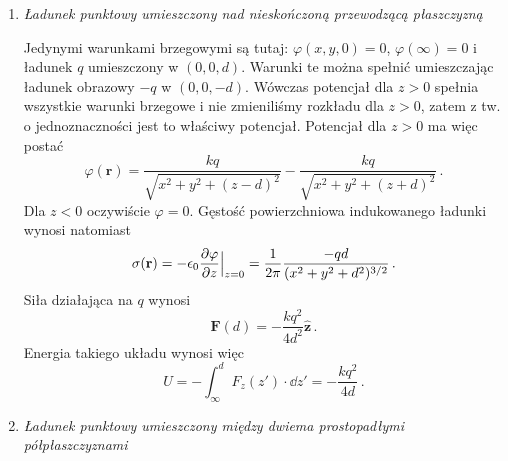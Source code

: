 \documentclass[../main.tex]{subfiles}
\begin{document}
\begin{enumerate}
    \item \textit{Ładunek punktowy umieszczony nad nieskończoną przewodzącą płaszczyzną}
    \medskip
    
    Jedynymi warunkami brzegowymi są tutaj: \(\varphi(x,y,0)=0\), \(\varphi(\infty)=0\) i ładunek
    \(q\) umieszczony w \((0,0,d)\). Warunki te można spełnić umieszczając ładunek obrazowy \(-q\) w
    \((0,0,-d)\). Wówczas potencjał dla \(z>0\) spełnia wszystkie warunki brzegowe i nie zmieniliśmy
    rozkładu dla \(z>0\), zatem z tw. o jednoznaczności jest to właściwy potencjał. Potencjał dla
    \(z>0\) ma więc postać
    \begin{equation*}
        \varphi(\mathbf{r})=\frac{kq}{\sqrt{x^2+y^2+(z-d)^2}}-\frac{kq}{\sqrt{x^2+y^2+(z+d)^2}}\,.
    \end{equation*}
    Dla \(z<0\) oczywiście \(\varphi=0\). Gęstość powierzchniowa indukowanego ładunki wynosi
    natomiast
    \begin{equation*}
        \sigma(\mathbf{r})=-\epsilon_0\pdv{\varphi}{z}\Big|_{z=0}=\frac{1}{2\pi}\frac{-qd}{(x^2+y^2+d^2)^{3/2}}\,.
    \end{equation*}
    Siła działająca na \(q\) wynosi
    \begin{equation*}
        \mathbf{F}(d)=-\frac{kq^2}{4d^2}\mathbf{\hat{z}}\,.
    \end{equation*}
    Energia takiego układu wynosi więc
    \begin{equation*}
        U=-\int_\infty^d F_z(z')\cdot\dd{z'}=-\frac{kq^2}{4d}\,.
    \end{equation*}
    
    \item \textit{Ładunek punktowy umieszczony między dwiema prostopadłymi półpłaszczyznami}
    \medskip
    

\end{enumerate}
\end{document}
